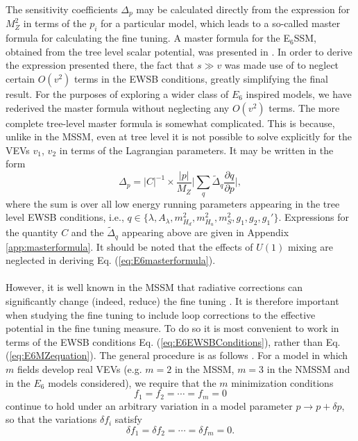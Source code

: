 \documentclass[preprint,amsmath,amssymb,aps,superscriptaddress,prd,showpacs,floatfix,nofootinbib]{revtex4-1}
\newcommand{\be}{\begin{equation}}
\newcommand{\ee}{\end{equation}}
\begin{document}
The sensitivity coefficients $\Delta_p$ may be calculated directly
from the expression for $M_Z^2$ in terms of the $p_i$ for a particular
model, which leads to a so-called master formula for calculating the
fine tuning. A master formula for the E$_6$SSM, obtained from the tree
level scalar potential, was presented in \cite{Athron:2013ipa}. In
order to derive the expression presented there, the fact that $s \gg
v$ was made use of to neglect certain $O(v^2)$ terms in the EWSB
conditions, greatly simplifying the final result. For the purposes of
exploring a wider class of $E_6$ inspired models, we have rederived
the master formula without neglecting any $O(v^2)$ terms. The more
complete tree-level master formula is somewhat complicated. This is
because, unlike in the MSSM, even at tree level it is not possible to
solve explicitly for the VEVs $v_1$, $v_2$ in terms of the Lagrangian
parameters. It may be written in the form \be \Delta_p=|C|^{-1}\times
\frac{|p|}{M_Z}\bigg|\sum_{q}\tilde{\Delta}_q\frac{\partial
  q}{\partial p}\bigg|,
\label{eq:E6masterformula}
\ee where the sum is over all low energy running parameters appearing
in the tree level EWSB conditions, i.e., $q\in\{\lambda, A_\lambda,
m_{H_d}^2,m_{H_u}^2,m_S^2,g_1,g_2,g_1'\}$. Expressions for the
quantity $C$ and the $\tilde{\Delta}_q$ appearing above are given in
Appendix \ref{app:masterformula}. It should be noted that the effects
of $U(1)$ mixing are neglected in deriving
Eq. (\ref{eq:E6masterformula}).\\ \\ However, it is well known in the
MSSM that radiative corrections can significantly change (indeed,
reduce) the fine tuning \cite{Cassel:2010px}. It is therefore
important when studying the fine tuning to include loop corrections to
the effective potential in the fine tuning measure. To do so it is
most convenient to work in terms of the EWSB conditions
Eq. (\ref{eq:E6EWSBConditions}), rather than
Eq. (\ref{eq:E6MZequation}). The general procedure is as follows
\cite{Ellwanger:2011mu}. For a model in which $m$ fields develop real
VEVs (e.g. $m=2$ in the MSSM, $m=3$ in the NMSSM and in the $E_6$
models considered), we require that the $m$ minimization conditions
\begin{equation}\label{eq:EWSBconditions}
f_1=f_2=\dotsb=f_m=0
\end{equation}
continue to hold under an arbitrary variation in a model parameter
$p\rightarrow p+\delta p$, so that the variations $\delta f_i$ satisfy
\begin{equation}\label{eq:EWSBvariations}
\delta f_1 = \delta f_2=\dotsb =\delta f_m =0.
\end{equation}
\end{document}
